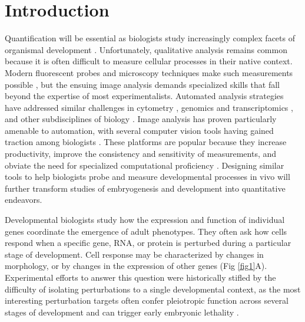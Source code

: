 \documentclass[10pt,letterpaper]{article}
\begin{document}
\linenumbers




\section*{Introduction}
Quantification will be essential as biologists study increasingly complex facets of organismal development \cite{Oates2009}. Unfortunately, qualitative analysis remains common because it is often difficult to measure cellular processes in their native context. Modern fluorescent probes and microscopy techniques make such measurements possible \cite{Muzzey2009a,Stelzer2014,Truong2011}, but the ensuing image analysis demands specialized skills that fall beyond the expertise of most experimentalists. Automated analysis strategies have addressed similar challenges in cytometry \cite{Aghaeepour2013,Chen2015,Pyne2009}, genomics and transcriptomics \cite{Bernstein2008,Hellemans2007,Langmead2012,Trapnell2009}, and other subdisciplines of biology \cite{Costes2004,Kelley2015}. Image analysis has proven particularly amenable to automation, with several computer vision tools having gained traction among biologists \cite{Carpenter2006,Paintdakhi2016,Schindelin2012,Sommer2011}. These platforms are popular because they increase productivity, improve the consistency and sensitivity of measurements, and obviate the need for specialized computational proficiency \cite{Jug2014,Sbalzarini2016,Schindelin2015}. Designing similar tools to help biologists probe and measure developmental processes in vivo will further transform studies of embryogenesis and development into quantitative endeavors.

Developmental biologists study how the expression and function of individual genes coordinate the emergence of adult phenotypes. They often ask how cells respond when a specific gene, RNA, or protein is perturbed during a particular stage of development. Cell response may be characterized by changes in morphology, or by changes in the expression of other genes (Fig \ref{fig1}A). Experimental efforts to answer this question were historically stifled by the difficulty of isolating perturbations to a single developmental context, as the most interesting perturbation targets often confer pleiotropic function across several stages of development and can trigger early embryonic lethality \cite{IanSimpson2002,Parody1993,Shilo1991}. 
\end{document}
